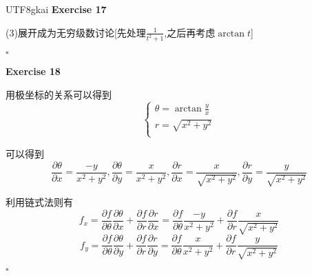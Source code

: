 \documentclass{article}
\newenvironment{exercise}[1]{%
{\textbf{Exercise #1} \\ 
    }
}{
  \hfill $\square$ 
  \par\bigskip 
}
\newcommand{\parameter}[1]{\left(#1\right)}
\newcommand{\bracket}[1]{\left[#1\right]}
\begin{document}
\begin{CJK}{UTF8}{gkai}
\begin{exercise}{17}




    (3)展开成为无穷级数讨论[先处理$\frac{1}{t^2 + 1}$,之后再考虑$\arctan t$]
\end{exercise}


\begin{exercise}{18}
    用极坐标的关系可以得到
    \[\begin{cases}
        \theta = \arctan \frac{y}{x}\\
        r = \sqrt{x^2 + y^2}\\
    \end{cases}\]   

    可以得到
    \[\frac{\partial \theta}{\partial x} = \frac{-y}{x^2 + y^2},\frac{\partial \theta}{\partial y} = \frac{x}{x^2 + y^2},\frac{\partial r}{\partial x} = \frac{x}{\sqrt{x^2 + y^2}},\frac{\partial r}{\partial y} = \frac{y}{\sqrt{x^2 + y^2}}\]

    利用链式法则有
    \[f_x = \frac{\partial f}{\partial \theta} \frac{\partial \theta}{\partial x} + \frac{\partial f}{\partial r} \frac{\partial r}{\partial x} = \frac{\partial f}{\partial \theta} \frac{-y}{x^2 + y^2} +  \frac{\partial f}{\partial r} \frac{x}{\sqrt{x^2 + y^2}}\]
    \[f_y = \frac{\partial f}{\partial \theta} \frac{\partial \theta}{\partial y} + \frac{\partial f}{\partial r} \frac{\partial r}{\partial y} = \frac{\partial f}{\partial \theta} \frac{x}{x^2 + y^2} +  \frac{\partial f}{\partial r} \frac{y}{\sqrt{x^2 + y^2}}\]


\end{exercise}
\end{CJK}
\end{document}
